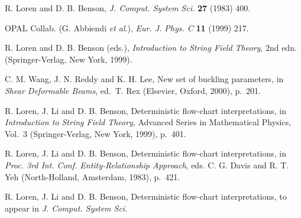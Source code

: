 \documentclass{ws-ijmpd}
\begin{document}
\begin{thebibliography}{0}    %

 R. Loren and D. B. Benson, {\it J. Comput.
System Sci.} {\bf 27} (1983) 400.

 OPAL Collab. (G. Abbiendi {\it et al}.),
{\it Eur. J. Phys. C} {\bf 11} (1999) 217.

 R. Loren and D. B. Benson (eds.), {\it Introduction to
String Field Theory}, 2nd edn. (Springer-Verlag, New York, 1999).

 C. M. Wang, J. N. Reddy and K. H. Lee, New set of
buckling parameters, in {\it Shear Deformable Beams}, ed.~T. Rex
(Elsevier, Oxford, 2000), p.~201.

 R. Loren, J. Li and D. B. Benson, Deterministic flow-chart
interpretations, in {\it Introduction to String Field Theory},
Advanced Series in Mathematical Physics, Vol.~3 (Springer-Verlag, New York, 1999),
p.~401.

 R. Loren, J. Li and D. B. Benson, Deterministic
flow-chart interpretations, in {\it Proc. 3rd Int. Conf.
Entity-Relationship Approach}, eds. C. G. Davis and R. T. Yeh
(North-Holland, Amsterdam, 1983), p.~421.

 R. Loren, J. Li and D. B. Benson, Deterministic
flow-chart interpretations, to appear in {\it J. Comput. System Sci.}
\end{thebibliography}
\end{document}
